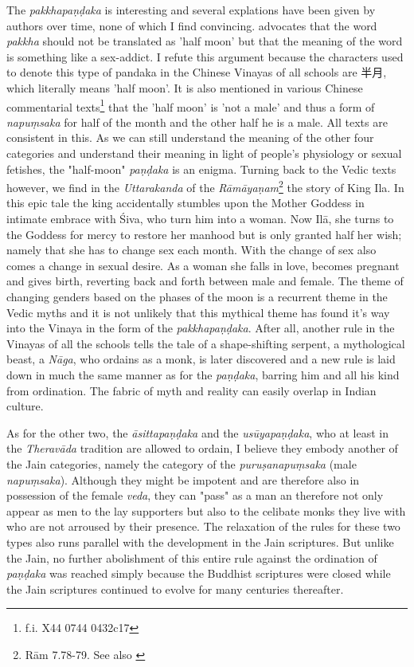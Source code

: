 The {\em pakkhapaṇḍaka} is interesting and several explations have been given by authors over time, none of which I find convincing. \cite{bomhard} advocates that the word {\em pakkha} should not be translated as 'half moon' but that the meaning of the word is something like a sex-addict. I refute this argument because the characters used to denote this type of pandaka in the Chinese Vinayas of all schools are 半月, which literally means 'half moon'. It is also mentioned in various Chinese commentarial texts\footnote{f.i. X44 0744 0432c17} that the 'half moon' is 'not a male' and thus a form of {\em napuṃsaka} for half of the month and the other half he is a male. All texts are consistent in this. As we can still understand the meaning of the other four categories and understand their meaning in light of people's physiology or sexual fetishes, the "half-moon" {\em paṇḍaka} is an enigma. Turning back to the Vedic texts however, we find in the {\em Uttarakanda} of the {\em Rāmāyaṇam}\footnote{Rām 7.78-79. See also \cite{goldman}} the story of King Ila. In this epic tale the king accidentally stumbles upon the Mother Goddess in intimate embrace with Śiva, who turn him into a woman. Now Ilā, she turns to the Goddess for mercy to restore her manhood but is only granted half her wish; namely that she has to change sex each month. With the change of sex also comes a change in sexual desire. As a woman she falls in love, becomes pregnant and gives birth, reverting back and forth between male and female. The theme of changing genders based on the phases of the moon is a recurrent theme in the Vedic myths and it is not unlikely that this mythical theme has found it's way into the Vinaya in the form of the {\em pakkhapaṇḍaka}. After all, another rule in the Vinayas of all the schools tells the tale of a shape-shifting serpent, a mythological beast, a {\em Nāga}, who ordains as a monk, is later discovered and a new rule is laid down in much the same manner as for the {\em paṇḍaka}, barring him and all his kind from ordination. The fabric of myth and reality can easily overlap in Indian culture.

As for the other two, the {\em āsittapaṇḍaka} and the {\em usūyapaṇḍaka}, who at least in the {\em Theravāda} tradition are allowed to ordain, I believe they embody another of the Jain categories, namely the category of the {\em puruṣanapuṃsaka} (male {\em napuṃsaka}). Although they might be impotent and are therefore also in possession of the female {\em veda}, they can "pass" as a man an therefore not only appear as men to the lay supporters but also to the celibate monks they live with who are not arroused by their presence. The relaxation of the rules for these two types also runs parallel with the development in the Jain scriptures. But unlike the Jain, no further abolishment of this entire rule against the ordination of {\em paṇḍaka} was reached simply because the Buddhist scriptures were closed while the Jain scriptures continued to evolve for many centuries thereafter.

